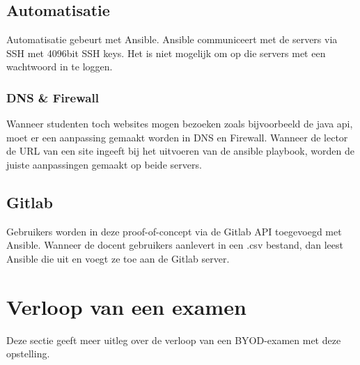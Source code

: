 \subsection{Automatisatie}
Automatisatie gebeurt met Ansible. Ansible communiceert met de servers via SSH met 4096bit SSH keys. Het is niet mogelijk om op die servers met een wachtwoord in te loggen.

\subsubsection{DNS \& Firewall}
Wanneer studenten toch websites mogen bezoeken zoals bijvoorbeeld de java api, moet er een aanpassing gemaakt worden in DNS en Firewall. Wanneer de lector de URL van een site ingeeft bij het uitvoeren van de ansible playbook, worden de juiste aanpassingen gemaakt op beide servers.

\subsection{Gitlab}
Gebruikers worden in deze proof-of-concept via de Gitlab API toegevoegd met Ansible. Wanneer de docent gebruikers aanlevert in een .csv bestand, dan leest Ansible die uit en voegt ze toe aan de Gitlab server. 

\section{Verloop van een examen}
Deze sectie geeft meer uitleg over de verloop van een BYOD-examen met deze opstelling.


